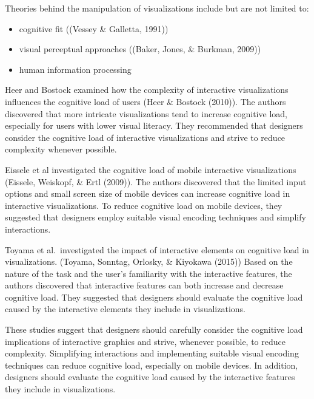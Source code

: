 \documentclass[print]{nuthesis}
\providecommand{\tightlist}{%
  \setlength{\itemsep}{0pt}\setlength{\parskip}{0pt}}
\begin{document}
Theories behind the manipulation of visualizations include but are not limited to:

\begin{itemize}
\tightlist
\item
  cognitive fit ((Vessey \& Galletta, 1991))
\item
  visual perceptual approaches ((Baker, Jones, \& Burkman, 2009))
\item
  human information processing
\end{itemize}


Heer and Bostock examined how the complexity of interactive visualizations influences the cognitive load of users (Heer \& Bostock (2010)).
The authors discovered that more intricate visualizations tend to increase cognitive load, especially for users with lower visual literacy.
They recommended that designers consider the cognitive load of interactive visualizations and strive to reduce complexity whenever possible.

Eissele et al investigated the cognitive load of mobile interactive visualizations (Eissele, Weiskopf, \& Ertl (2009)).
The authors discovered that the limited input options and small screen size of mobile devices can increase cognitive load in interactive visualizations.
To reduce cognitive load on mobile devices, they suggested that designers employ suitable visual encoding techniques and simplify interactions.

Toyama et al.~investigated the impact of interactive elements on cognitive load in visualizations. (Toyama, Sonntag, Orlosky, \& Kiyokawa (2015))
Based on the nature of the task and the user's familiarity with the interactive features, the authors discovered that interactive features can both increase and decrease cognitive load.
They suggested that designers should evaluate the cognitive load caused by the interactive elements they include in visualizations.

These studies suggest that designers should carefully consider the cognitive load implications of interactive graphics and strive, whenever possible, to reduce complexity.
Simplifying interactions and implementing suitable visual encoding techniques can reduce cognitive load, especially on mobile devices.
In addition, designers should evaluate the cognitive load caused by the interactive features they include in visualizations.
\end{document}
